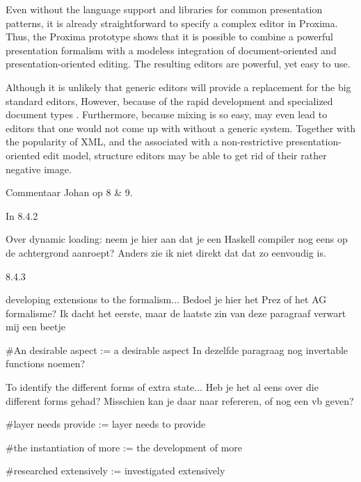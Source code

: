 Even without the language support and libraries for common presentation patterns, it is already straightforward to specify a complex editor in Proxima. Thus, the Proxima prototype shows that it is possible to combine a powerful presentation formalism with a modeless integration of document-oriented and presentation-oriented editing. The resulting editors are powerful, yet easy to use.

\bc
\toHere
Although it is unlikely that generic editors will provide a replacement for the big standard editors,  However, because of the rapid development and  specialized document types . Furthermore, because mixing is so easy, may even lead to editors that one would not come up with without a generic system. Together with the popularity of XML, and the associated with a non-restrictive presentation-oriented edit model, structure editors may be able to get rid of their rather negative image.
\ec








\bc
Commentaar Johan op 8 & 9.

In 8.4.2

Over dynamic loading: neem je hier aan dat je een Haskell compiler nog
eens op de achtergrond aanroept? Anders zie ik niet direkt dat dat zo
eenvoudig is.


8.4.3


developing extensions to the formalism... Bedoel je hier het Prez of het
AG formalisme? Ik dacht het eerste, maar de laatste zin van deze paragraaf
verwart mij een beetje

#An desirable aspect := a desirable aspect
In dezelfde paragraag nog invertable functions noemen?

To identify the different forms of extra state... Heb je het al eens over
die different forms gehad? Misschien kan je daar naar refereren, of nog
een vb geven?

#layer needs provide := layer needs to provide

#the instantiation of more := the development of more

#researched extensively := investigated extensively


